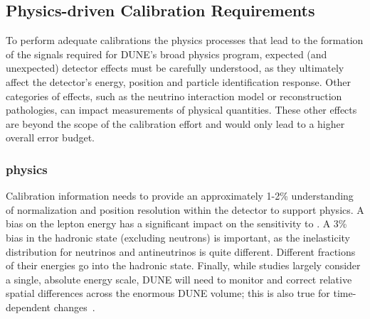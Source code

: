 \begin{comment}
Under current assumptions, the calibration strategy described in this document is applicable to both \dwords{spmod} and \dwords{dpmod}. Sections~\ref{sec:phys-calib-req} and \ref{sec:phys-calib-approach} briefly describe the physics-driven calibration requirements, including the calibration sources and the systems required at the different stages of the experiment. The nominal \dword{dune} \dword{fd} calibration design is described in Section~\ref{sec:phys-calib-sources}. Finally, Section~\ref{sec:phys-calib-sum} provides a summary along with future plans for calibration.
\end{comment}



\subsection{Physics-driven Calibration Requirements}
\label{sec:phys-calib-req}


To perform adequate calibrations the physics processes that lead to the formation of the signals required for DUNE's broad physics program,
expected (and unexpected) detector effects must be carefully understood, as they ultimately affect the detector's energy, position and particle identification response. 
Other categories of effects, such as the neutrino interaction model or reconstruction pathologies, can impact measurements of physical quantities. These other effects are beyond the scope of the  calibration effort and would only lead to a higher overall error budget.

\subsubsection{ physics}
\label{sec:phys-calib-lbl}
Calibration information needs to provide an approximately 1-2\% understanding of normalization 
and position resolution within the detector to support   physics. 
A bias on the lepton energy has a significant impact on the sensitivity to . 
%
A \num{3}\% bias in the hadronic state (excluding neutrons) is important, as the inelasticity  distribution for neutrinos and antineutrinos is quite different.  Different fractions of their energies go into the hadronic state. Finally, while studies largely consider a single, absolute energy scale, DUNE will need to monitor and correct relative spatial differences across the enormous DUNE  volume; this is also true for time-dependent changes~\cite{ebias}.

